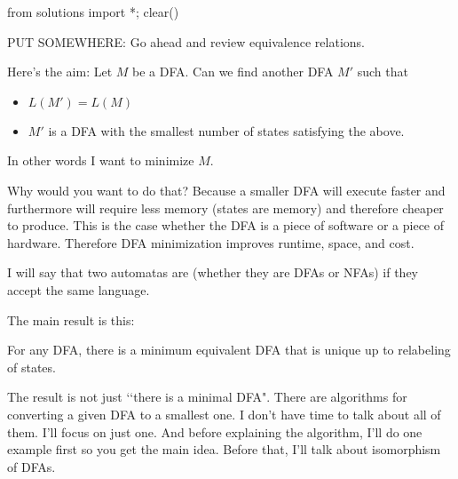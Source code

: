 \begin{python0}
from solutions import *; clear()
\end{python0}


PUT SOMEWHERE: Go ahead and review equivalence relations.

Here's the aim: Let $M$ be a DFA. Can we find another DFA $M'$ such
that
\begin{itemize}
\item $L(M') = L(M)$
\item $M'$ is a DFA with the smallest number of states satisfying
  the above.
\end{itemize}
In other words I want to minimize $M$.

Why would you want to do that?
Because a smaller DFA will execute faster and
furthermore will require less memory (states are memory)
and therefore cheaper to produce.
This is the case whether the DFA is a piece of software
or a piece of hardware.
Therefore DFA minimization improves runtime, space,
and cost.

I will say that two automatas are  (whether they
are DFAs or NFAs) if they
accept the same language.



The main result is this:

\begin{thm}
  For any DFA, there is a minimum equivalent DFA that is unique
  up to relabeling of states.
\end{thm}

The result is not just \lq\lq there is a minimal DFA".
There are algorithms for converting a given DFA to a smallest one.
I don't have time to talk about all of them.
I'll focus on just one.
And before explaining the algorithm, I'll do one example
first so you get the main idea.
Before that, I'll talk about isomorphism of DFAs.

